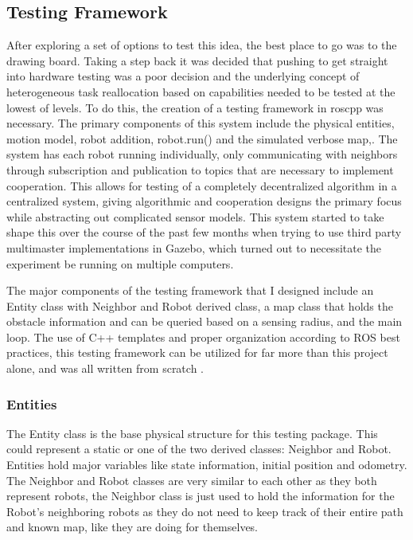 \subsection{Testing Framework}

After exploring a set of options to test this idea, the best place to go was to the drawing
board. Taking a step back it was decided that pushing to get straight into hardware testing
was a poor decision and the underlying concept of heterogeneous task reallocation based on
capabilities needed to be tested at the lowest of levels. To do this, the creation of a testing
framework in roscpp was necessary. The primary components of this system include the physical entities,
motion model, robot addition, robot.run() and the simulated verbose map,. The system has each robot
running individually, only communicating with neighbors through subscription and publication
to topics that are necessary to implement cooperation. This allows for testing of a completely
decentralized algorithm in a centralized system, giving algorithmic and cooperation designs
the primary focus while abstracting out complicated sensor models. This system started to take
shape this over the course of the past few months when trying to use third party multimaster
implementations in Gazebo, which turned out to necessitate the experiment be running on multiple
computers.

The major components of the testing framework that I designed include an Entity class with Neighbor and Robot derived class, a map class
that holds the obstacle information and can be queried based on a sensing radius, and the main loop.
The use of C++ templates and proper organization according to ROS best practices, this testing framework
can be utilized for far more than this project alone, and was all written from scratch \cite{ROS}.

\subsubsection{Entities}

The Entity class is the base physical structure for this testing package. This could represent a static
or one of the two derived classes: Neighbor and Robot. Entities hold major variables like state
information, initial position and odometry. The Neighbor and Robot classes are very similar to each other
as they both represent robots, the Neighbor class is just used to hold the information for the
Robot's neighboring robots as they do not need to keep track of their entire path and known map,
like they are doing for themselves.

